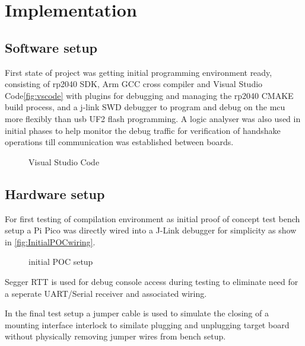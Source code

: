 \clearpage%
\vspace{21.5pt}
\chapter{Implementation}
\section{Software  setup}

First state of project was getting initial programming environment ready, consisting of rp2040 SDK, Arm GCC cross compiler and Visual Studio Code\autoref{fig:vscode} with plugins for debugging and managing the rp2040 CMAKE build process, and a j-link SWD debugger to program and debug on the \gls{mcu} more flexibly than \gls{usb} UF2 flash programming. A logic analyser was also used in initial phases to help monitor the debug traffic for verification of handshake operations till communication was established between boards.

\begin{figure}[ht]
	\centering
	\caption{Visual Studio Code}
	\label{fig:vscode}
\end{figure}

\clearpage
\section{Hardware setup}
%

For first testing of compilation environment as initial proof of concept test bench setup a Pi Pico was directly wired into a J-Link debugger for simplicity as show in \autoref{fig:InitialPOCwiring}.

\begin{figure}[ht]
	\centering
	\caption{initial POC setup}
	\label{fig:InitialPOCwiring}
\end{figure}

Segger RTT\cite{JLinkRTTReal} is used for debug console access during testing to eliminate need for a seperate UART/Serial receiver and associated wiring.

In the final test setup a jumper cable is used to simulate the closing of a mounting interface interlock to similate plugging and unplugging target board without physically removing jumper wires from bench setup.


